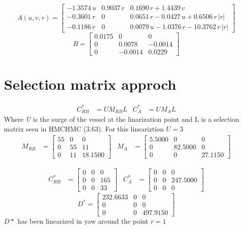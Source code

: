\documentclass[12pt,a4]{article}
\begin{document}
\begin{equation}
	A(u,v,r) = \left[\begin{array}{ccc} -1.3574\,u & 0.9037\,r & 0.1690\,r+1.4439\,v\\ -0.3601\,r & 0 & 0.0651\,r-0.0427\,u+0.6506\,r\,\left|r\right|\\ -0.1186\,r & 0 & 0.0079\,u-1.0376\,r-10.3762\,r\,\left|r\right| \end{array}\right]
\end{equation}
\begin{equation}
	B = \left[\begin{array}{ccc} 0.0175 & 0 & 0\\ 0 & 0.0078 & -0.0014\\ 0 & -0.0014 & 0.0229 \end{array}\right]
\end{equation}


\section{Selection matrix approch}

\begin{align}
	C^*_{RB} & = UM_{RB}L
	         &
	C^*_{A}  & = UM_AL
\end{align}
Where \textit{U} is the surge of the vessel at the linarization point and L is a selection matrix seen in HMCHMC (3.63).
For this lineariztion $U=3$
\begin{align}
	M_{RB} & = \left[\begin{array}{ccc} 55 & 0 & 0\\ 0 & 55 & 11\\ 0 & 11 & 18.1500 \end{array}\right]
	       &
	M_{A}  & = \left[\begin{array}{ccc} 5.5000 & 0 & 0\\ 0 & 82.5000 & 0\\ 0 & 0 & 27.1150 \end{array}\right]
\end{align}

\begin{align}
	C^*_{RB} & = \left[\begin{array}{ccc} 0 & 0 & 0\\ 0 & 0 & 165\\ 0 & 0 & 33 \end{array}\right]
	         &
	C^*_{A}  & = \left[\begin{array}{ccc} 0 & 0 & 0\\ 0 & 0 & 247.5000\\ 0 & 0 & 0 \end{array}\right]
\end{align}
\begin{equation}
	D^* = \left[\begin{array}{ccc} 232.6633 & 0 & 0\\ 0 & 0 & 0\\ 0 & 0 & 497.9150 \end{array}\right]
\end{equation}
$D*$ has been linearized in yaw around the point $r = 1$
\end{document}
